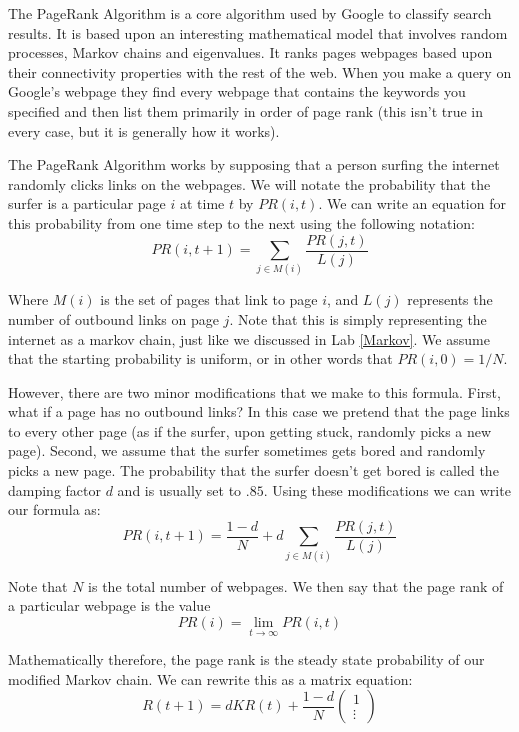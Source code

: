 \label{Ch:PageRank}


The PageRank Algorithm is a core algorithm used by Google to classify search results. It is based upon an interesting mathematical model that involves random processes, Markov chains and eigenvalues. It ranks pages webpages based upon their connectivity properties with the rest of the web. When you make a query on Google's webpage they find every webpage that contains the keywords you specified and then list them primarily in order of page rank (this isn't true in every case, but it is generally how it works).

The PageRank Algorithm works by supposing that a person surfing the internet randomly clicks links on the webpages. We will notate the probability that the surfer is a particular page $i$ at time $t$ by $PR(i,t)$. We can write an equation for this probability from one time step to the next using the following notation:
\[
PR(i,t+1) = \sum_{j \in M(i)} \frac{PR(j,t)}{L(j)}
\]

Where $M(i)$ is the set of pages that link to page $i$, and $L(j)$ represents the number of outbound links on page $j$. Note that this is simply representing the internet as a markov chain, just like we discussed in Lab \ref{Markov}. We assume that the starting probability is uniform, or in other words that $PR(i,0) = 1/N$.

However, there are two minor modifications that we make to this formula. First, what if a page has no outbound links? In this case we pretend that the page links to every other page (as if the surfer, upon getting stuck, randomly picks a new page). Second, we assume that the surfer sometimes gets bored and randomly picks a new page. The probability that the surfer doesn't get bored is called the damping factor $d$ and is usually set to $.85$. Using these modifications we can write our formula as:
\[
PR(i,t+1) = \frac{1-d}{N} + d\sum_{j \in M(i)} \frac{PR(j,t)}{L(j)}
\]

Note that $N$ is the total number of webpages. We then say that the page rank of a particular webpage is the value
\[
PR(i) = \lim_{t\to \infty} PR(i,t)
\]

Mathematically therefore, the page rank is the steady state probability of our modified Markov chain. We can rewrite this as a matrix equation:
\[
R(t+1) = d K R(t) + \frac{1-d}{N} \begin{pmatrix}1\\\vdots\end{pmatrix}
\]

